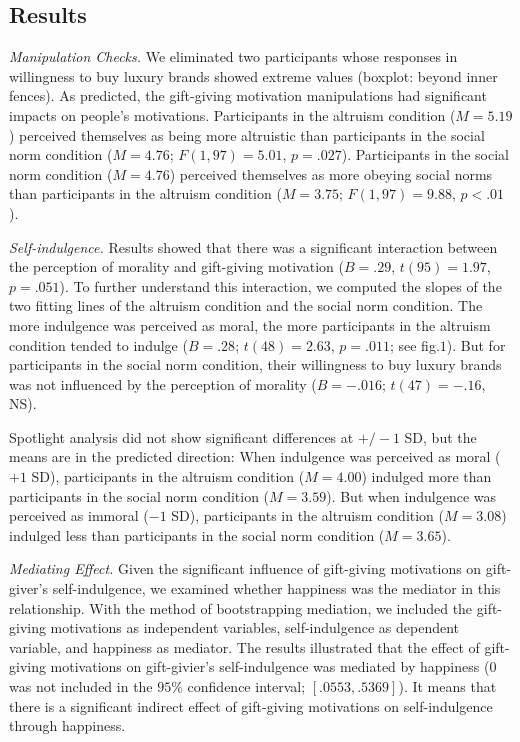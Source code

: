 \documentclass[11pt, a4paper, leqno]{article}
\begin{document}
\subsection{Results}

\setlength{\parindent}{2ex}
\emph{Manipulation Checks.} We eliminated two participants whose responses in willingness to buy luxury brands showed extreme values (boxplot: beyond inner fences). As predicted, the gift-giving motivation manipulations had significant impacts on people's motivations. Participants in the altruism condition ($M= 5.19$) perceived themselves as being more altruistic than participants in the social norm condition ($M= 4.76$; $F(1, 97)= 5.01$, $p= .027$). Participants in the social norm condition ($M= 4.76$) perceived themselves as more obeying social norms than participants in the altruism condition ($M= 3.75$; $F(1, 97)= 9.88$, $p< .01$). \par

\emph{Self-indulgence.} Results showed that there was a significant interaction between the perception of morality and gift-giving motivation ($B= .29$, $t(95)= 1.97$, $p= .051$). To further understand this interaction, we computed the slopes of the two fitting lines of the altruism condition and the social norm condition. The more indulgence was perceived as moral, the more participants in the altruism condition tended to indulge ($B= .28$; $t(48)= 2.63$, $p= .011$; see fig.$1$). But for participants in the social norm condition, their willingness to buy luxury brands was not influenced by the perception of morality ($B= -.016$; $t(47)= -.16$, NS). \par
Spotlight analysis did not show significant differences at $+/-1$ SD, but the means are in the predicted direction: When indulgence was perceived as moral ($+1$ SD), participants in the altruism condition ($M= 4.00$) indulged more than participants in the social norm condition ($M= 3.59$). But when indulgence was perceived as immoral ($-1$ SD), participants in the altruism condition ($M= 3.08$) indulged less than participants in the social norm condition ($M= 3.65$). \par

\emph{Mediating Effect.} Given the significant influence of gift-giving motivations on gift-giver's self-indulgence, we examined whether happiness was the mediator in this relationship. With the method of bootstrapping mediation, we included the gift-giving motivations as independent variables, self-indulgence as dependent variable, and happiness as mediator. The results illustrated that the effect of gift-giving motivations on gift-givier's self-indulgence was mediated by happiness ($0$ was not included in the $95\%$ confidence interval; $[.0553, .5369]$). It means that there is a significant indirect effect of gift-giving motivations on self-indulgence through happiness. \par
\end{document}
